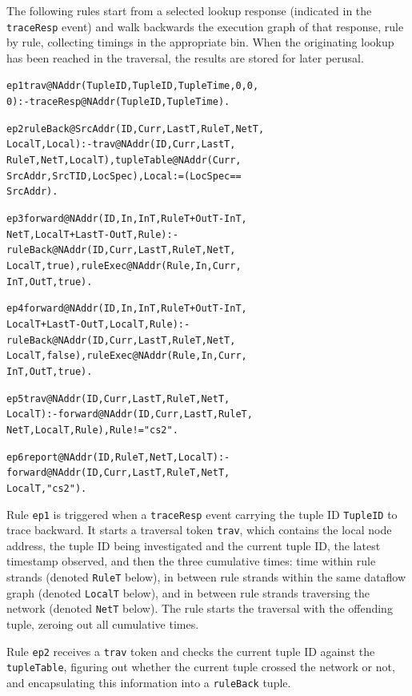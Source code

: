 \documentclass{sig-alt-full}
\newenvironment{overlog}{\begin{alltt}\footnotesize}{\end{alltt}}
\newcommand{\ol}[1]{{\tt\footnotesize#1}}
\begin{document}
The following rules start from a selected lookup
response (indicated in the \ol{traceResp} event) and
walk backwards the execution graph of that
response, rule by rule, collecting timings in the
appropriate bin.  When the originating lookup has been
reached in the traversal, the results are stored for
later perusal.
\begin{overlog}
ep1 trav@NAddr(TupleID, TupleID, TupleTime, 0, 0,
   0) :- traceResp@NAddr(TupleID, TupleTime).

ep2 ruleBack@SrcAddr(ID, Curr, LastT, RuleT, NetT,
   LocalT, Local) :- trav@NAddr(ID, Curr, LastT,
   RuleT, NetT, LocalT), tupleTable@NAddr(Curr,
   SrcAddr, SrcTID, LocSpec), Local := (LocSpec ==
   SrcAddr).

ep3 forward@NAddr(ID, In, InT, RuleT + OutT - InT,
   NetT, LocalT + LastT - OutT, Rule) :-
   ruleBack@NAddr(ID, Curr, LastT, RuleT, NetT,
   LocalT, true), ruleExec@NAddr(Rule, In, Curr,
   InT, OutT, true).

ep4 forward@NAddr(ID, In, InT, RuleT + OutT - InT,
   LocalT + LastT - OutT, LocalT, Rule) :-
   ruleBack@NAddr(ID, Curr, LastT, RuleT, NetT,
   LocalT, false), ruleExec@NAddr(Rule, In, Curr,
   InT, OutT, true).

ep5 trav@NAddr(ID, Curr, LastT, RuleT, NetT,
   LocalT) :- forward@NAddr(ID, Curr, LastT, RuleT,
   NetT, LocalT, Rule), Rule != "cs2".

ep6 report@NAddr(ID, RuleT, NetT, LocalT) :-
   forward@NAddr(ID, Curr, LastT, RuleT, NetT,
   LocalT, "cs2").
\end{overlog}
Rule \ol{ep1} is triggered when a \ol{traceResp}
event carrying the tuple ID \ol{TupleID} to trace
backward.  It starts a traversal token \ol{trav},
which contains the local node address, the tuple ID
being investigated and the current tuple ID, the
latest timestamp observed, and then the three
cumulative times: time within rule strands (denoted
\ol{RuleT} below), in between rule
strands within the same dataflow graph (denoted
\ol{LocalT} below),
and in between rule strands traversing the network
(denoted \ol{NetT} below).  The rule starts the
traversal with the offending tuple, zeroing out all
cumulative times.

Rule \ol{ep2} receives a \ol{trav} token and checks
the current tuple ID against the \ol{tupleTable},
figuring out whether the current tuple crossed the
network or not, and encapsulating this information
into a \ol{ruleBack} tuple.
\end{document}
